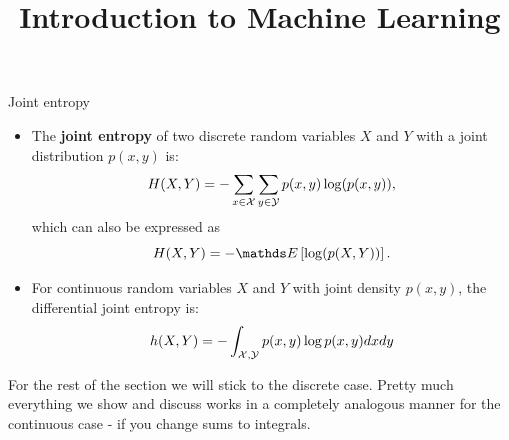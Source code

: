 



\newcommand{\titlefigure}{figure/entropy_plot.png}
\newcommand{\learninggoals}{
  \item Know the joint entropy
  \item Know conditional entropy as remaining uncertainty 
  \item Know mutual information as the amount of information of an RV obtained by another
}

\title{Introduction to Machine Learning}
\date{}





\begin{vbframe}{Joint entropy}
\begin{itemize}
  \item The \textbf{joint entropy} of two discrete random variables $X$ and $Y$ with a joint distribution $p(x, y)$ is:
  $$ H(X,Y) = -\sum_{x \in \mathcal{X}} \sum_{y \in \mathcal{Y}}  p(x,y) \log(p(x,y)),$$ 
  which can also be expressed as $$ H(X,Y) = -\E \left[ \log(p(X,Y)) \right].$$
  \item For continuous random variables $X$ and $Y$ with joint density $p(x,y)$, the differential joint entropy is:\\
  $$ h(X,Y) = - \int_{\mathcal{X},\mathcal{Y}} p(x,y) \log p(x,y) dx dy$$
\end{itemize}

\begin{footnotesize}
For the rest of the section we will stick to the discrete case. Pretty much everything we show and discuss works in a completely analogous manner for the continuous case - if you change sums to integrals.
\end{footnotesize}

\end{vbframe}

